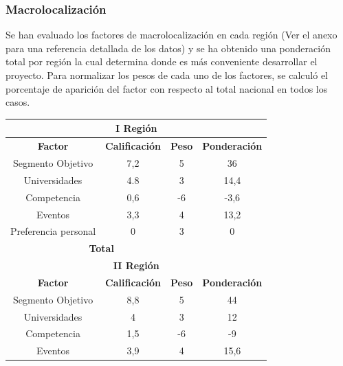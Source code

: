 \subsubsection{Macrolocalización}
Se han evaluado los factores de macrolocalización en cada región (Ver el anexo para una referencia detallada de los datos) y se ha obtenido
una ponderación total por región la cual determina donde es más
conveniente desarrollar el proyecto. Para normalizar los pesos de cada uno de los factores, se calculó
el porcentaje de aparición del factor con respecto al total nacional en todos los casos.
\begin{table}[!htb!]
\centering
	\begin{tabular}{|c|c|c|c|}
	\hline
	\multicolumn{4}{|c|}{\textbf{I Región}} \\
	\hline
	\textbf{Factor}                              & \textbf{Calificación} & \textbf{Peso} & \textbf{Ponderación} \\
	\hline
	Segmento Objetivo                            & 7,2                    & 5                     & 36 \\
	\hline
	Universidades                                & 4.8                    & 3                     & 14,4\\
	\hline
	Competencia                                  & 0,6                    & -6                    & -3,6 \\
	\hline
	Eventos                                      & 3,3                    & 4                     & 13,2 \\
	\hline
	Preferencia personal                         & 0                      & 3                     & 0 \\
	\hline
	\multicolumn{3}{|c|}{\textbf{Total}}         & \textbf{\blue{60}}\\
	\hline
	\multicolumn{4}{|c|}{\textbf{II Región}} \\
	\hline
	\textbf{Factor}                              & \textbf{Calificación} & \textbf{Peso} & \textbf{Ponderación} \\
	\hline
	Segmento Objetivo                            & 8,8                    & 5                     & 44 \\
	\hline
	Universidades                                & 4                      & 3                     & 12 \\
	\hline
	Competencia                                  & 1,5                    & -6                    & -9 \\
	\hline
	Eventos                                      & 3,9                    & 4                     & 15,6 \\

\end{tabular}
\end{table}
